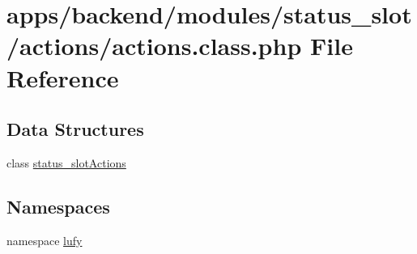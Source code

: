 \hypertarget{backend_2modules_2status__slot_2actions_2actions_8class_8php}{\section{apps/backend/modules/status\-\_\-slot/actions/actions.class.\-php File Reference}
\label{backend_2modules_2status__slot_2actions_2actions_8class_8php}
}
\subsection*{Data Structures}
\begin{DoxyCompactItemize}
\item 
class \hyperlink{classstatus__slot_actions}{status\-\_\-slot\-Actions}
\end{DoxyCompactItemize}
\subsection*{Namespaces}
\begin{DoxyCompactItemize}
\item 
namespace \hyperlink{namespacelufy}{lufy}
\end{DoxyCompactItemize}
